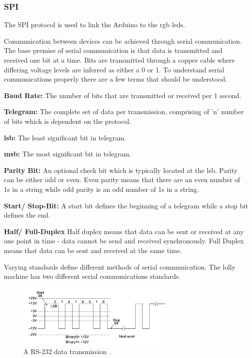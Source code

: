     \subsubsection{SPI}
    The SPI protocol is used to link the Arduino to the \acrshort{rgb} \acrshort{led}s.
    
    Communication between devices can be achieved through serial communication. The base premise of serial communication is that data is transmitted and received one bit at a time\cite{frenzel2015handbook}. Bits are transmitted through a copper cable where differing voltage levels are inferred as either a 0 or 1\cite{frenzel2015handbook}. To understand serial communications properly there are a few terms that should be understood.
    \begin{description}
        \item\textbf{Baud Rate:} The number of bits that are transmitted or received per 1 second.
        \item\textbf{Telegram:} The complete set of data per transmission, comprising of 'n' number of bits which is dependent on the protocol.
        \item\textbf{\acrshort{lsb}:} The least significant bit in telegram.
        \item\textbf{\acrshort{msb}:} The most significant bit in telegram.
        \item\textbf{Parity Bit:} An optional check bit which is typically located at the \acrshort{lsb}. Parity can be either odd or even. Even parity means that there are an even number of 1s in a string while odd parity is an odd number of 1s in a string.
        \item\textbf{Start/ Stop-Bit:} A start bit defines the beginning of a telegram while a stop bit defines the end.
        \item\textbf{Half/ Full-Duplex} Half duplex means that data can be sent or received at any one point in time - data cannot be send and received synchronously. Full Duplex means that data can be sent and received at the same time.
    \end{description}
    Varying standards define different methods of serial communication. The lolly machine has two different serial communications standards. 
    
   
        \begin{figure}[H]
            \centering
            \includegraphics[width = 0.7\textwidth]{2_images/rs232Trans.png}
            \caption{A RS-232 data transmission~\cite{frenzel2015handbook}.}
            \label{fig:rs232Trans}
        \end{figure} 
    \newpage    
 
